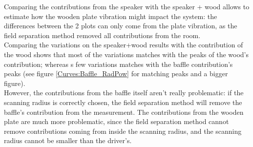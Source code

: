 \documentclass{report}
\begin{document}
Comparing the contributions from the speaker with the speaker + wood allows to estimate how the wooden plate vibration might impact the system: the differences between the 2 plots can only come from the plate vibration, as the field separation method removed all contributions from the room. \\
Comparing the variations on the speaker+wood results with the contribution of the wood shows that most of the variations matches with the peaks of the wood's contribution; whereas s few variations matches with the baffle contribution's peaks (see figure \ref{Curves:Baffle_RadPow} for matching peaks and a bigger figure). \\

However, the contributions from the baffle itself aren't really problematic: if the scanning radius is correctly chosen, the field separation method will remove the baffle's contribution from the measurement. The contributions from the wooden plate are much more problematic, since the field separation method cannot remove contributions coming from inside the scanning radius, and the scanning radius cannot be smaller than the driver's. 
\end{document}
